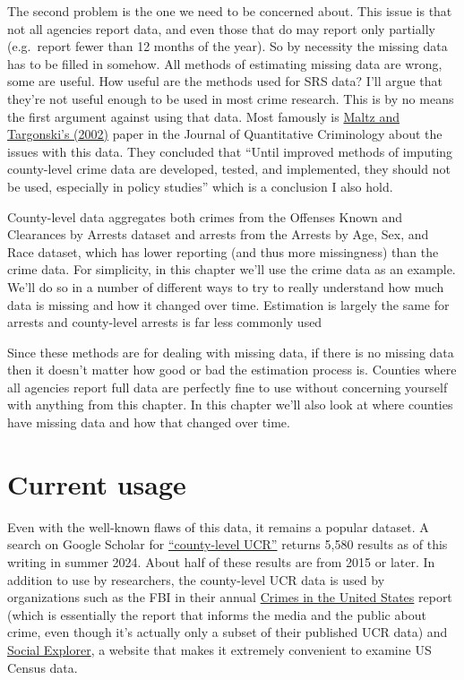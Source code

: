 \documentclass[
  12pt,
  openany]{book}
\begin{document}
The second problem is the one we need to be concerned about. This issue is that not all agencies report data, and even those that do may report only partially (e.g.~report fewer than 12 months of the year). So by necessity the missing data has to be filled in somehow. All methods of estimating missing data are wrong, some are useful. How useful are the methods used for SRS data? I'll argue that they're not useful enough to be used in most crime research. This is by no means the first argument against using that data. Most famously is \href{https://link.springer.com/article/10.1023/A:1016060020848}{Maltz and Targonski's (2002)} paper in the Journal of Quantitative Criminology about the issues with this data. They concluded that ``Until improved methods of imputing county-level crime data are developed, tested, and implemented, they should not be used, especially in policy studies'' which is a conclusion I also hold.

County-level data aggregates both crimes from the Offenses Known and Clearances by Arrests dataset and arrests from the Arrests by Age, Sex, and Race dataset, which has lower reporting (and thus more missingness) than the crime data. For simplicity, in this chapter we'll use the crime data as an example. We'll do so in a number of different ways to try to really understand how much data is missing and how it changed over time. Estimation is largely the same for arrests and county-level arrests is far less commonly used

Since these methods are for dealing with missing data, if there is no missing data then it doesn't matter how good or bad the estimation process is. Counties where all agencies report full data are perfectly fine to use without concerning yourself with anything from this chapter. In this chapter we'll also look at where counties have missing data and how that changed over time.

\section{Current usage}\label{current-usage}

Even with the well-known flaws of this data, it remains a popular dataset. A search on Google Scholar for \href{https://scholar.google.com/scholar?q=county-level+ucr&hl=en&as_sdt=0,20}{``county-level UCR''} returns 5,580 results as of this writing in summer 2024. About half of these results are from 2015 or later. In addition to use by researchers, the county-level UCR data is used by organizations such as the FBI in their annual \href{https://ucr.fbi.gov/crime-in-the-u.s}{Crimes in the United States} report (which is essentially the report that informs the media and the public about crime, even though it's actually only a subset of their published UCR data) and \href{https://www.socialexplorer.com/explore-maps}{Social Explorer}, a website that makes it extremely convenient to examine US Census data.
\end{document}
